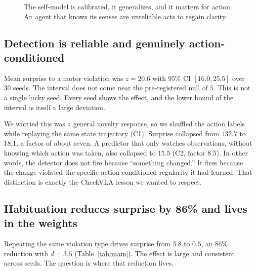 \documentclass[11pt,a4paper]{article}
\begin{document}
\begin{figure}[h]
\centering
{}
\caption{The self-model is calibrated, it generalizes, and it matters for action. An agent that knows its senses are unreliable acts to regain clarity.}
\label{fig:phi}
\end{figure}

\subsection{Detection is reliable and genuinely action-conditioned}

Mean surprise to a motor violation was $z=20.6$ with 95\% CI $[16.0, 25.5]$ over 30 seeds. The interval does not come near the pre-registered null of $5$. This is not a single lucky seed. Every seed shows the effect, and the lower bound of the interval is itself a large deviation.

We worried this was a general novelty response, so we shuffled the action labels while replaying the same state trajectory (C1). Surprise collapsed from $132.7$ to $18.1$, a factor of about seven. A predictor that only watches observations, without knowing which action was taken, also collapsed to $15.5$ (C2, factor $8.5$). In other words, the detector does not fire because ``something changed.'' It fires because the change violated the specific action-conditioned regularity it had learned. That distinction is exactly the CheckVLA lesson we wanted to respect.

\subsection{Habituation reduces surprise by 86\% and lives in the weights}

Repeating the same violation type drives surprise from $3.8$ to $0.5$, an 86\% reduction with $d=3.5$ (Table~\ref{tab:main}). The effect is large and consistent across seeds. The question is where that reduction lives.
\end{document}
